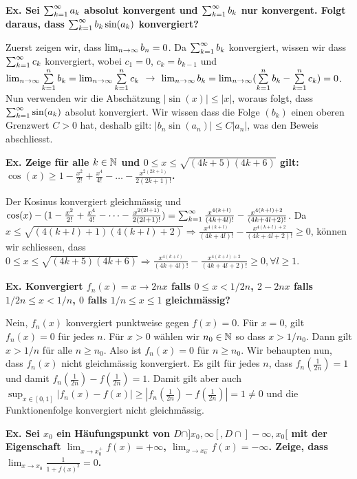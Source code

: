 \textbf{Ex. Sei $\sum_{k = 1}^{\infty} a_k$ absolut konvergent und $\sum_{k = 1}^{\infty} b_k$ nur konvergent. Folgt daraus, dass $\sum_{k = 1}^{\infty} b_k \sin(a_k)$ konvergiert?} 

Zuerst zeigen wir, dass $\lim_{n \rightarrow \infty} b_n = 0$. Da $\sum_{k = 1}^{\infty} b_k$ konvergiert, wissen wir dass $\sum_{k = 1}^{\infty} c_k$
konvergiert, wobei $c_1 = 0$, $c_k = b_{k-1}$ und $\lim_{n \rightarrow \infty} \sum\limits_{k = 1}^n b_k = \lim_{n \rightarrow \infty} \sum\limits_{k = 1}^n c_k$
$\to$ $\lim_{n \rightarrow \infty} b_k = \lim_{n \rightarrow \infty} (\sum\limits_{k = 1}^n b_k - \sum\limits_{k = 1}^n c_k) = 0$. Nun verwenden wir die
Abschätzung $|\sin(x)| \leq |x|$, woraus folgt, dass $\sum_{k = 1}^{\infty} \sin(a_k)$ absolut konvergiert. Wir wissen
dass die Folge $(b_k)$ einen oberen Grenzwert $C > 0$ hat, deshalb gilt: $|b_n \sin(a_n)| \leq C|a_n|$,
was den Beweis abschliesst. \medskip


\textbf{Ex. Zeige für alle $k \in \mathbb{N}$ und $0 \leq x \leq \sqrt{(4k+5)(4k+6)}$ gilt: $\cos(x) \geq 1 - \frac{x^2}{2!} + \frac{x^4}{4!} - \dots - \frac{x^{2(2k+1)}}{2(2k+1)!}$.} 

Der Kosinus konvergiert gleichmässig und $\cos(x) - (1 - \frac{x^2}{2!} + \frac{x^4}{4!} - \dots - \frac{x^{2(2l+1)}}{2(2l+1)!}) 
= \sum_{k = 1}^{\infty} \frac{x^{4(k + l)}}{(4k + 4l)!} - \frac{x^{4(k + l) + 2}}{(4k + 4l + 2)!}$. Da 
$x \leq \sqrt{(4(k+l) + 1)(4(k+l) + 2)} \Rightarrow \frac{x^{4(k + l)}}{(4k + 4l)!} - \frac{x^{4(k + l) + 2}}{(4k + 4l + 2)!} \geq 0$,
können wir schliessen, dass $0 \leq x \leq \sqrt{(4k+5)(4k+6)} \Rightarrow \frac{x^{4(k + l)}}{(4k + 4l)!} - \frac{x^{4(k + l) + 2}}{(4k + 4l + 2)!} \geq 0, \forall l \geq 1$.
\medskip

\textbf{Ex. Konvergiert $f_n(x) = x \to 2nx$ falls $0 \leq x < 1/2n$, $2-2nx$ falls $1/2n \leq x < 1/n$, $0$ falls $1/n \leq x \leq 1$ gleichmässig?} 

Nein, $f_n(x)$ konvergiert punktweise gegen $f(x) = 0$. Für $x= 0$, gilt $f_n(x) = 0$ für jedes $n$. Für
$x > 0$ wählen wir $n_0 \in \mathbb{N}$ so dass $x > 1/n_0$. Dann gilt $x > 1/n$ für alle $n \geq n_0$. Also ist 
$f_n(x) = 0$ für $n \geq n_0$. Wir behaupten nun, dass $f_n(x)$ nicht gleichmässig konvergiert.
Es gilt für jedes $n$, dass $f_n(\frac{1}{2n}) = 1$ und damit $f_n(\frac{1}{2n}) - f(\frac{1}{2n}) = 1$.
Damit gilt aber auch $\sup_{x\in[0,1]} |f_n(x) - f(x)| \geq |f_n(\frac{1}{2n}) - f(\frac{1}{2n})| = 1 \neq 0 $
und die Funktionenfolge konvergiert nicht gleichmässig. \medskip

\textbf{Ex. Sei $x_0$ ein Häufungspunkt von $D \cap ]x_0 , \infty[, D \cap ]- \infty , x_0[$ mit der Eigenschaft
$\lim_{x \to x_0^+} f(x) = +\infty$, $\lim_{x \to x_0^-} f(x) = -\infty$. Zeige, dass $\lim_{x \to x_0} \frac{1}{1 + f(x)^2} = 0$.} 

